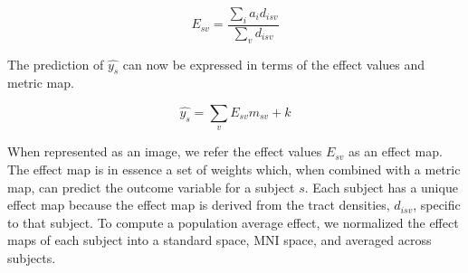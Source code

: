 \begin{equation}
E_{sv} = \frac{\sum_i{ a_i d_{isv}}}{\sum_v {d_{isv}}}
\end{equation}

The prediction of $\hat{y_s}$ can now be expressed in terms of the effect values and metric map. 

\begin{equation}
\hat{y_s} = \displaystyle\sum_v{ E_{sv} m_{sv}} + k
\end{equation}

When represented as an image, we refer the effect values $E_{sv}$ as an effect map. The effect map is in essence a set of weights which, when combined with a metric map, can predict the outcome variable for a subject $s$. Each subject has a unique effect map because the effect map is derived from the tract densities, $d_{isv}$, specific to that subject. To compute a population average effect, we normalized the effect maps of each subject into a standard space, MNI space, and averaged across subjects.

